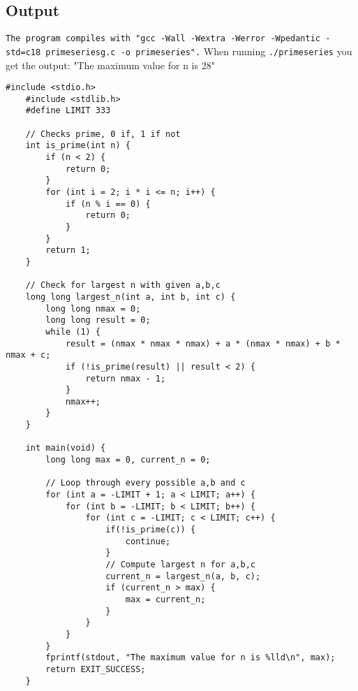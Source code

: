 \documentclass[12pt,a4paper]{article}
\begin{document}
\subsection{Output}
\texttt{The program compiles with "gcc -Wall -Wextra -Werror -Wpedantic -std=c18 primeseriesg.c -o primeseries".}
When running \texttt{./primeseries} you get the output: 
\newline
"The maximum value for n is 28"

\vspace{3em}
\begin{lstlisting}[caption={7001st prime in C},label={lst:p7001}]
    #include <stdio.h>
    #include <stdlib.h>
    #define LIMIT 333
    
    // Checks prime, 0 if, 1 if not
    int is_prime(int n) {
        if (n < 2) {
            return 0;
        }
        for (int i = 2; i * i <= n; i++) {
            if (n % i == 0) {
                return 0;
            }
        }
        return 1;
    }
    
    // Check for largest n with given a,b,c
    long long largest_n(int a, int b, int c) {
        long long nmax = 0;
        long long result = 0;
        while (1) {
            result = (nmax * nmax * nmax) + a * (nmax * nmax) + b * nmax + c;
            if (!is_prime(result) || result < 2) {
                return nmax - 1;
            }
            nmax++;
        }
    }
    
    int main(void) {
        long long max = 0, current_n = 0;
    
        // Loop through every possible a,b and c
        for (int a = -LIMIT + 1; a < LIMIT; a++) {
            for (int b = -LIMIT; b < LIMIT; b++) {
                for (int c = -LIMIT; c < LIMIT; c++) {
                    if(!is_prime(c)) {
                        continue;
                    }
                    // Compute largest n for a,b,c
                    current_n = largest_n(a, b, c);
                    if (current_n > max) {
                        max = current_n;
                    }
                }
            }
        }
        fprintf(stdout, "The maximum value for n is %lld\n", max);
        return EXIT_SUCCESS;
    }
\end{lstlisting}
\end{document}
